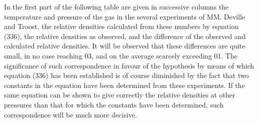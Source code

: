\documentclass[12pt]{memoir}
\begin{document}
In the first part of the following table are given in successive columns the temperature and pressure of the gas in the several experiments of MM. Deville and Troost, the relative densities calculated from these numbers by equation (336), the relative densities as observed, and the difference of the observed and calculated relative densities. It will be observed that these differences are quite small, in no case reaching 03, and on the average scarcely exceeding 01. The significance of such correspondence in favour of the hypothesis by means of which equation (336) has been established is of course diminished by the fact that two constants in the equation have been determined from these experiments. If the same equation can be shown to give correctly the relative densities at other pressures than that for which the constants have been determined, such correspondence will be much more decisive.
\end{document}
